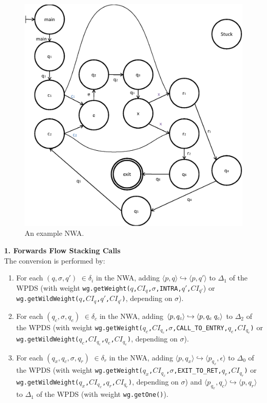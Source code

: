 \documentclass{llncs}
\begin{document}
\begin{figure}[htbp]
  \centering
    \includegraphics[width=12cm]{Figures/Figure23.eps}
  \caption{An example NWA.}
  \label{Fig:NWAtoPDS1}
\end{figure}

\noindent \textbf{1. Forwards Flow Stacking Calls} \\

\noindent The conversion is performed by:

\begin{enumerate}

\item For each $(q,\sigma,q')$ $\in \delta_i$ in the NWA, adding $\langle p,q \rangle \hookrightarrow \langle p,q' \rangle$ to $\Delta_1$ of the WPDS (with weight \texttt{wg.getWeight($q$,$CI_q$,$\sigma$,INTRA,$q'$,$CI_{q'}$}) or \texttt{wg.getWildWeight($q$,$CI_q$,$q'$,$CI_{q'}$)}, depending on $\sigma$).

\item For each $(q_c,\sigma, q_e)$ $\in \delta_c$ in the NWA, adding $\langle p,q_c \rangle \hookrightarrow \langle p, q_e \hspace{.1cm} q_c \rangle$ to $\Delta_2$ of the WPDS (with weight \texttt{wg.getWeight($q_c$,$CI_{q_c}$,$\sigma$,CALL\_TO\_ENTRY,$q_e$,$CI_{q_e}$)} or \texttt{wg.getWildWeight($q_c$,$CI_{q_c}$,$q_e$,$CI_{q_e}$)}, depending on $\sigma$).

\item For each $(q_x,q_c,\sigma,q_r)$ $\in \delta_r$ in the NWA, adding $\langle p,q_x \rangle \hookrightarrow \langle p_{q_x},\epsilon \rangle$ to $\Delta_0$ of the WPDS (with weight \texttt{wg.getWeight($q_x$,$CI_{q_x}$,$\sigma$,EXIT\_TO\_RET,$q_r$,$CI_{q_r}$)} or \texttt{wg.getWildWeight($q_x$,$CI_{q_x}$,$q_r$,$CI_{q_r}$)}, depending on $\sigma$) and $\langle p_{q_x},q_c \rangle \hookrightarrow \langle p,q_r \rangle$ to $\Delta_1$ of the WPDS (with weight \texttt{wg.getOne()}).

\end{enumerate}
\end{document}
